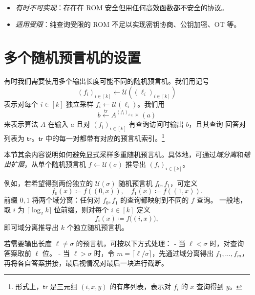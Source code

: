 \documentclass[american,singlepageview]{snargs-book-zh}
\newcommand{\DefineEqual}{\coloneqq}
\newcommand{\ProtoAdversary}{A}
\newcommand{\ROFunction}{f}
\newcommand{\RODistribution}[1]{\mathcal{U}(#1)}
\newcommand{\ROOutputAndTrace}[4]{#4 \xleftarrow{#3} {#2}^{#1}}
\newcommand{\ROVectorLength}{k}
\newcommand{\ROQuery}{x}
\newcommand{\ROAnswer}{y}
\newcommand{\ROTrace}{\mathsf{tr}}
\newcommand{\ROAdversary}{\ProtoAdversary}
\newcommand{\ROOutputSize}{\sigma}
\newcommand{\ROChosenOutputSize}{\ell}
\newcommand{\RONumOutputChunks}{m}
\begin{document}
\begin{itemize}[noitemsep]
  \item \emph{有时不可实现}：存在在 ROM 安全但用任何高效函数都不安全的协议。
  \item \emph{适用受限}：纯查询受限的 ROM 不足以实现密钥协商、公钥加密、OT 等。
\end{itemize}

\section{多个随机预言机的设置}
\label{section:rom-derivations}

有时我们需要使用多个输出长度可能不同的随机预言机。我们用记号
\begin{equation*}
(\ROFunction_{i})_{i \in [\ROVectorLength]} \gets \RODistribution{(\ROChosenOutputSize_{i})_{i \in [\ROVectorLength]}}
\end{equation*}
表示对每个 $i\in[\ROVectorLength]$ 独立采样 $\ROFunction_{i}\gets\RODistribution{\ROChosenOutputSize_{i}}$。我们用
\begin{equation*}
\ROOutputAndTrace{(\ROFunction_{i})_{i \in [\ROVectorLength]}}{\ROAdversary}{\ROTrace}{b}(a)
\end{equation*}
来表示算法 $\ROAdversary$ 在输入 $a$ 且对 $(\ROFunction_{i})_{i\in[\ROVectorLength]}$ 有查询访问时输出 $b$，且其查询-回答对列表为 $\ROTrace$。$\ROTrace$ 中的每一对都带有对应的预言机索引。\footnote{形式上，$\ROTrace$ 是三元组 $(i,\ROQuery,\ROAnswer)$ 的有序列表，表示对 $\ROFunction_{i}$ 的 $\ROQuery$ 查询得到 $\ROAnswer$。}

本节其余内容说明如何避免显式采样多重随机预言机。具体地，可通过\emph{域分离}和\emph{输出扩展}，从单个随机预言机 $\ROFunction\gets\RODistribution{\ROOutputSize}$ 推导出 $(\ROFunction_{i})_{i\in[\ROVectorLength]}$。

例如，若希望得到两份独立的 $\RODistribution{\ROOutputSize}$ 随机预言机 $\ROFunction_{0},\ROFunction_{1}$，可定义
\[
\ROFunction_{0}(\ROQuery)\DefineEqual\ROFunction((0,\ROQuery)),\quad
\ROFunction_{1}(\ROQuery)\DefineEqual\ROFunction((1,\ROQuery)).
\]
前缀 $0,1$ 将两个域分离：任何对 $\ROFunction_{0},\ROFunction_{1}$ 的查询都映射到不同的 $\ROFunction$ 查询。  
一般地，取 $i$ 为 $\lceil\log_2\ROVectorLength\rceil$ 位前缀，则对每个 $i\in[\ROVectorLength]$ 定义
\[
\ROFunction_{i}(\ROQuery)\DefineEqual\ROFunction\bigl((i,\ROQuery)\bigr),
\]
即可域分离推导出 $\ROVectorLength$ 个独立随机预言机。

若需要输出长度 $\ROChosenOutputSize\neq\ROOutputSize$ 的预言机，可按以下方式处理：  
- 当 $\ROChosenOutputSize<\ROOutputSize$ 时，对查询答案取前 $\ROChosenOutputSize$ 位。  
- 当 $\ROChosenOutputSize>\ROOutputSize$ 时，令 $\RONumOutputChunks=\lceil\ROChosenOutputSize/\ROOutputSize\rceil$，先通过域分离得出 $\ROFunction_{1},\dots,\ROFunction_{\RONumOutputChunks}$，再将各自答案拼接，最后视情况对最后一块进行截断。
\end{document}
